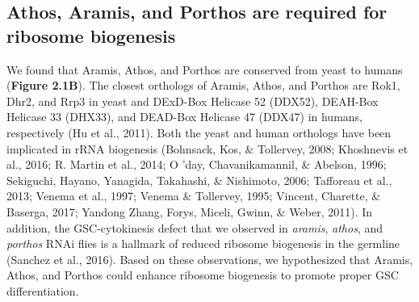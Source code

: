 \documentclass[12pt,oneside]{reedthesis}
\begin{document}
\textbf{\hfill\break
}

\hypertarget{athos-aramis-and-porthos-are-required-for-ribosome-biogenesis}{%
\subsection{Athos, Aramis, and Porthos are required for ribosome biogenesis}\label{athos-aramis-and-porthos-are-required-for-ribosome-biogenesis}}

We found that Aramis, Athos, and Porthos are conserved from yeast to humans (\textbf{Figure 2.1B}). The closest orthologs of Aramis, Athos, and Porthos are Rok1, Dhr2, and Rrp3 in yeast and DExD-Box Helicase 52 (DDX52), DEAH-Box Helicase 33 (DHX33), and DEAD-Box Helicase 47 (DDX47) in humans, respectively (Hu et al., 2011). Both the yeast and human orthologs have been implicated in rRNA biogenesis (Bohnsack, Kos, \& Tollervey, 2008; Khoshnevis et al., 2016; R. Martin et al., 2014; O 'day, Chavanikamannil, \& Abelson, 1996; Sekiguchi, Hayano, Yanagida, Takahashi, \& Nishimoto, 2006; Tafforeau et al., 2013; Venema et al., 1997; Venema \& Tollervey, 1995; Vincent, Charette, \& Baserga, 2017; Yandong Zhang, Forys, Miceli, Gwinn, \& Weber, 2011). In addition, the GSC-cytokinesis defect that we observed in \emph{aramis}, \emph{athos}, and \emph{porthos} RNAi flies is a hallmark of reduced ribosome biogenesis in the germline (Sanchez et al., 2016). Based on these observations, we hypothesized that Aramis, Athos, and Porthos could enhance ribosome biogenesis to promote proper GSC differentiation.
\end{document}
